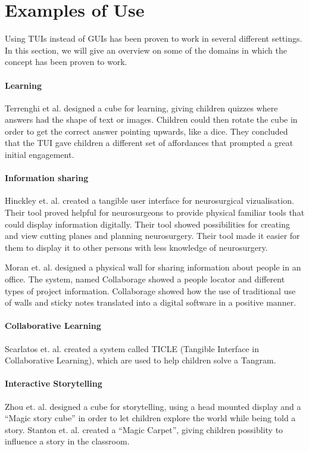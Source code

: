 \section{Examples of Use}
\label{sec:tuiexamples}
Using TUIs instead of GUIs has been proven to work in several different settings. In this section, we will give an overview on some of the domains in which the concept has been proven to work. 

\paragraph{Learning}
Terrenghi et al. designed a cube for learning, giving children quizzes where answers had the shape of text or images\cite{terrenghi2006cube}. Children could then rotate the cube in order to get the correct answer pointing upwards, like a dice. They concluded that the TUI gave children a different set of affordances that prompted a great initial engagement\cite{terrenghi2006cube}. 

\paragraph{Information sharing}
Hinckley et. al. created a tangible user interface for neurosurgical vizualisation\cite{hinckley1994passive}. Their tool proved helpful for neurosurgeons to provide physical familiar tools that could display information digitally. Their tool showed possibilities for creating and view cutting planes and planning neurosurgery. Their tool made it easier for them to display it to other persons with less knowledge of neurosurgery. 

Moran et. al. designed a physical wall for sharing information about people in an office\cite{moran1999design}. The system, named Collaborage showed a people locator and different types of project information. Collaborage showed how the use of traditional use of walls and sticky notes translated into a digital software in a positive manner.


\paragraph{Collaborative Learning}
Scarlatos et. al. created a system called TICLE (Tangible Interface in Collaborative Learning), which are used to help children solve a Tangram\cite{scarlatos1999ticle}.  


\paragraph{Interactive Storytelling}
Zhou et. al. designed a cube for storytelling, using a head mounted display and a ``Magic story cube'' in order to let children explore the world while being told a story\cite{zhou2004magic}. Stanton et. al. created a ``Magic Carpet'', giving children possiblity to influence a story in the classroom\cite{stanton2001classroom}. 


